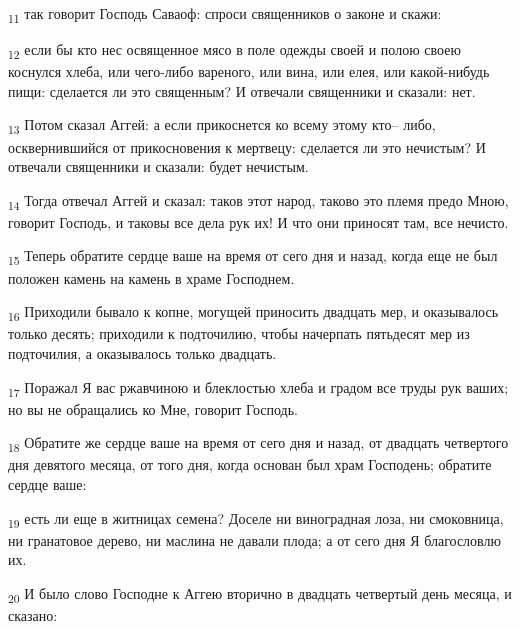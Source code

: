 \begin{tcolorbox}
\textsubscript{11} так говорит Господь Саваоф: спроси священников о законе и скажи:
\end{tcolorbox}
\begin{tcolorbox}
\textsubscript{12} если бы кто нес освященное мясо в поле одежды своей и полою своею коснулся хлеба, или чего-либо вареного, или вина, или елея, или какой-нибудь пищи: сделается ли это священным? И отвечали священники и сказали: нет.
\end{tcolorbox}
\begin{tcolorbox}
\textsubscript{13} Потом сказал Аггей: а если прикоснется ко всему этому кто-- либо, осквернившийся от прикосновения к мертвецу: сделается ли это нечистым? И отвечали священники и сказали: будет нечистым.
\end{tcolorbox}
\begin{tcolorbox}
\textsubscript{14} Тогда отвечал Аггей и сказал: таков этот народ, таково это племя предо Мною, говорит Господь, и таковы все дела рук их! И что они приносят там, все нечисто.
\end{tcolorbox}
\begin{tcolorbox}
\textsubscript{15} Теперь обратите сердце ваше на время от сего дня и назад, когда еще не был положен камень на камень в храме Господнем.
\end{tcolorbox}
\begin{tcolorbox}
\textsubscript{16} Приходили бывало к копне, могущей приносить двадцать мер, и оказывалось только десять; приходили к подточилию, чтобы начерпать пятьдесят мер из подточилия, а оказывалось только двадцать.
\end{tcolorbox}
\begin{tcolorbox}
\textsubscript{17} Поражал Я вас ржавчиною и блеклостью хлеба и градом все труды рук ваших; но вы не обращались ко Мне, говорит Господь.
\end{tcolorbox}
\begin{tcolorbox}
\textsubscript{18} Обратите же сердце ваше на время от сего дня и назад, от двадцать четвертого дня девятого месяца, от того дня, когда основан был храм Господень; обратите сердце ваше:
\end{tcolorbox}
\begin{tcolorbox}
\textsubscript{19} есть ли еще в житницах семена? Доселе ни виноградная лоза, ни смоковница, ни гранатовое дерево, ни маслина не давали плода; а от сего дня Я благословлю их.
\end{tcolorbox}
\begin{tcolorbox}
\textsubscript{20} И было слово Господне к Аггею вторично в двадцать четвертый день месяца, и сказано:
\end{tcolorbox}
